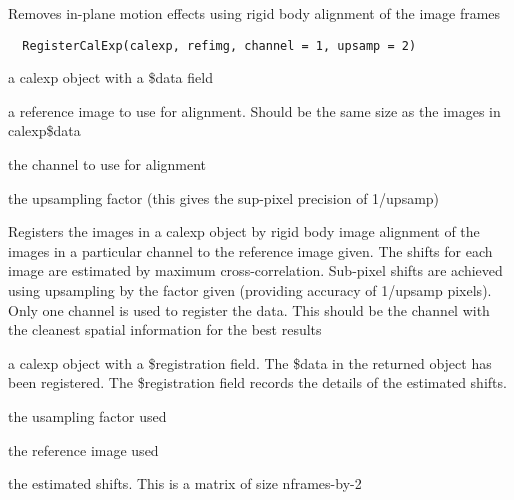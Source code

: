 \documentclass[a4paper]{book}
\begin{document}
%
\begin{Description}\relax
Removes in-plane motion effects using rigid body
alignment of the image frames
\end{Description}
%
\begin{Usage}
\begin{verbatim}
  RegisterCalExp(calexp, refimg, channel = 1, upsamp = 2)
\end{verbatim}
\end{Usage}
%
\begin{Arguments}
\begin{ldescription}
\item[\code{calexp}] a calexp object with a \bsl{}\$data field

\item[\code{refimg}] a reference image to use for alignment.
Should be the same size as the images in calexp\bsl{}\$data

\item[\code{channel}] the channel to use for alignment

\item[\code{upsamp}] the upsampling factor (this gives the
sup-pixel precision of 1/upsamp)
\end{ldescription}
\end{Arguments}
%
\begin{Details}\relax
Registers the images in a calexp object by rigid body
image alignment of the images in a particular channel to
the reference image given.  The shifts for each image are
estimated by maximum cross-correlation. Sub-pixel shifts
are achieved using upsampling by the factor given
(providing accuracy of 1/upsamp pixels).  Only one
channel is used to register the data.  This should be the
channel with the cleanest spatial information for the
best results
\end{Details}
%
\begin{Value}
a calexp object with a \bsl{}\$registration field.  The \bsl{}\$data
in the returned object has been registered.  The
\bsl{}\$registration field records the details of the estimated
shifts.  \begin{ldescription}
\item[\code{upsamp}] the usampling factor used
\item[\code{refimg}] the reference image used\item[\code{mpars}] the
estimated shifts. This is a matrix of size nframes-by-2
\end{ldescription}
\end{Value}
\end{document}
